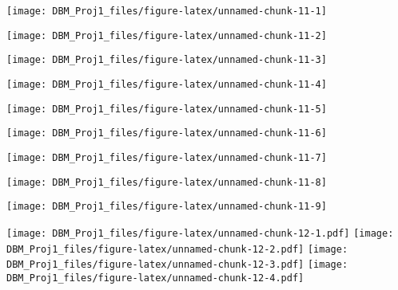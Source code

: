 \documentclass[
]{article}
\begin{document}
\begin{center}\texttt{[image: DBM\_Proj1\_files/figure-latex/unnamed-chunk-11-1]} \end{center}

\begin{center}\texttt{[image: DBM\_Proj1\_files/figure-latex/unnamed-chunk-11-2]} \end{center}

\begin{center}\texttt{[image: DBM\_Proj1\_files/figure-latex/unnamed-chunk-11-3]} \end{center}

\begin{center}\texttt{[image: DBM\_Proj1\_files/figure-latex/unnamed-chunk-11-4]} \end{center}

\begin{center}\texttt{[image: DBM\_Proj1\_files/figure-latex/unnamed-chunk-11-5]} \end{center}

\begin{center}\texttt{[image: DBM\_Proj1\_files/figure-latex/unnamed-chunk-11-6]} \end{center}

\begin{center}\texttt{[image: DBM\_Proj1\_files/figure-latex/unnamed-chunk-11-7]} \end{center}

\begin{center}\texttt{[image: DBM\_Proj1\_files/figure-latex/unnamed-chunk-11-8]} \end{center}

\begin{center}\texttt{[image: DBM\_Proj1\_files/figure-latex/unnamed-chunk-11-9]} \end{center}

\texttt{[image: DBM\_Proj1\_files/figure-latex/unnamed-chunk-12-1.pdf]}
\texttt{[image: DBM\_Proj1\_files/figure-latex/unnamed-chunk-12-2.pdf]}
\texttt{[image: DBM\_Proj1\_files/figure-latex/unnamed-chunk-12-3.pdf]}
\texttt{[image: DBM\_Proj1\_files/figure-latex/unnamed-chunk-12-4.pdf]}
\end{document}
